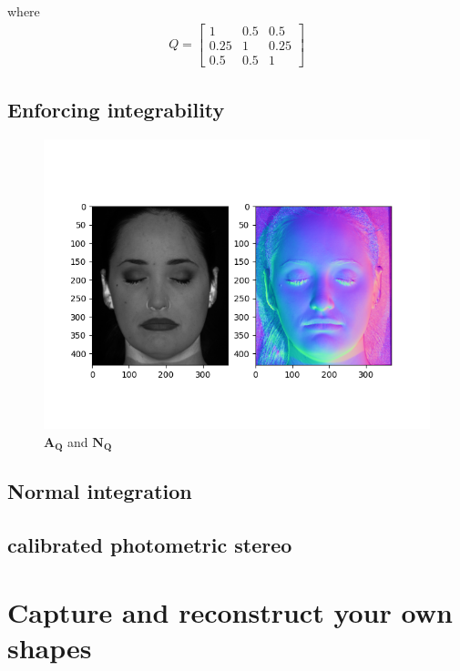\documentclass{article}
\begin{document}
where 
\begin{align}
Q =
\begin{bmatrix}
    1 & 0.5 & 0.5\\
    0.25 & 1 & 0.25 \\
    0.5 & 0.5 & 1
\end{bmatrix}
\end{align}

\subsection{Enforcing integrability}


\begin{figure}[ht]
    \centering
    \includegraphics[scale=0.8]{../data/output/enforce.png}
    \caption{$\mathbf{A_Q}$ and $\mathbf{N_Q}$}
\end{figure}
\newpage

\subsection{Normal integration}




\subsection{calibrated photometric stereo}




\section{Capture and reconstruct your own shapes}
\end{document}
